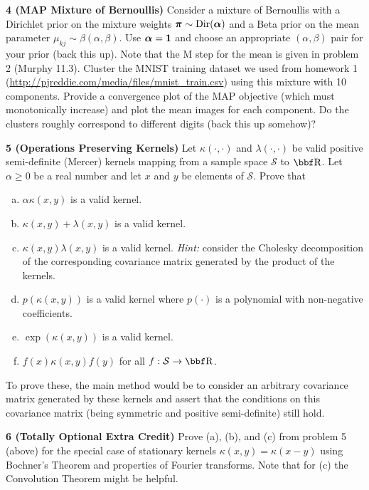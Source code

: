 \documentclass[12pt,letterpaper,fleqn]{hmcpset}
\begin{document}
\textbf{4 (MAP Mixture of Bernoullis)} Consider a mixture of Bernoullis with a Dirichlet prior on the mixture
weights $\hbox{\boldmath$\pi$} \sim \mathrm{Dir}(\hbox{\boldmath$\alpha$})$ and a Beta prior on the mean parameter $\mu_{kj} \sim \beta(\alpha,\beta)$.
Use $\hbox{\boldmath$\alpha$}={\bf 1}$ and choose an appropriate $(\alpha,\beta)$ pair for your prior (back this up).
Note that the M step for the mean is given in problem 2 (Murphy 11.3). Cluster the MNIST training dataset we used
from homework 1 (\url{http://pjreddie.com/media/files/mnist_train.csv}) using this mixture with 10 components.
Provide a convergence plot of the MAP objective
(which must monotonically increase) and plot the mean images for each component. Do the clusters roughly correspond to
different digits (back this up somehow)?

\textbf{5 (Operations Preserving Kernels)} Let $\kappa(\cdot,\cdot)$ and $\lambda(\cdot,\cdot)$ be valid positive
semi-definite (Mercer) kernels mapping from a sample space $\mathcal{S}$ to $\RR$. Let $\alpha \geq 0$ be a real number
and let $x$ and $y$ be elements of $\mathcal{S}$. Prove that
\begin{enumerate}[(a)]
    \item $\alpha\kappa(x,y)$ is a valid kernel.
    \item $\kappa(x,y) + \lambda(x,y)$ is a valid kernel.
    \item $\kappa(x,y)\lambda(x,y)$ is a valid kernel. \textit{Hint:} consider the Cholesky decomposition
        of the corresponding covariance matrix generated by the product of the kernels.
    \item $p(\kappa(x,y))$ is a valid kernel where $p(\cdot)$ is a polynomial
        with non-negative coefficients.
    \item $\exp(\kappa(x,y))$ is a valid kernel.
    \item $f(x)\kappa(x,y)f(y)$ for all $f : \mathcal{S}\to\RR$.
\end{enumerate}
To prove these, the main method would be to consider an arbitrary covariance matrix
generated by these kernels and assert that the conditions on this covariance matrix (being
symmetric and positive semi-definite) still hold.

\textbf{6 (Totally Optional Extra Credit)} Prove (a), (b), and (c) from problem 5 (above) for the special
case of stationary kernels $\kappa(x,y) = \kappa(x-y)$ using Bochner's Theorem and properties of
Fourier transforms. Note that for (c) the Convolution Theorem might be helpful.
\end{document}
